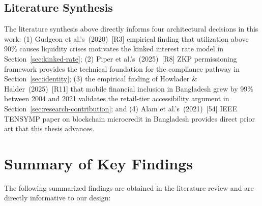 \documentclass[12pt,a4paper]{report}
\begin{document}
\subsection{Literature Synthesis}

The literature synthesis above directly informs four architectural decisions in this work: (1) Gudgeon et al.'s~(2020)~[R3] empirical finding that utilization above 90\% causes liquidity crises motivates the kinked interest rate model in Section~\ref{sec:kinked-rate}; (2) Piper et al.'s~(2025)~[R8] ZKP permissioning framework provides the technical foundation for the compliance pathway in Section~\ref{sec:identity}; (3) the empirical finding of Howlader \& Halder~(2025)~[R11] that mobile financial inclusion in Bangladesh grew by 99\% between 2004 and 2021 validates the retail-tier accessibility argument in Section~\ref{sec:research-contribution}; and (4) Alam et al.'s~(2021)~[54] IEEE TENSYMP paper on blockchain microcredit in Bangladesh provides direct prior art that this thesis advances.

\section{Summary of Key Findings}

The following summarized findings are obtained in the literature review and are directly informative to our design:
\end{document}

